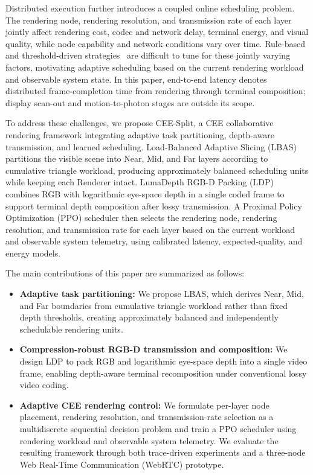 \documentclass[10pt,journal,compsoc]{IEEEtran}
\begin{document}
Distributed execution further introduces a coupled online scheduling problem. The rendering node, rendering resolution, and transmission rate of each layer jointly affect rendering cost, codec and network delay, terminal energy, and visual quality, while node capability and network conditions vary over time. Rule-based and threshold-driven strategies~\cite{lai_furion_2020,lu_renderfusion_2023} are difficult to tune for these jointly varying factors, motivating adaptive scheduling based on the current rendering workload and observable system state. In this paper, end-to-end latency denotes distributed frame-completion time from rendering through terminal composition; display scan-out and motion-to-photon stages are outside its scope.

To address these challenges, we propose CEE-Split, a CEE collaborative rendering framework integrating adaptive task partitioning, depth-aware transmission, and learned scheduling. Load-Balanced Adaptive Slicing (LBAS) partitions the visible scene into Near, Mid, and Far layers according to cumulative triangle workload, producing approximately balanced scheduling units while keeping each Renderer intact. LumaDepth RGB-D Packing (LDP) combines RGB with logarithmic eye-space depth in a single coded frame to support terminal depth composition after lossy transmission. A Proximal Policy Optimization (PPO) scheduler then selects the rendering node, rendering resolution, and transmission rate for each layer based on the current workload and observable system telemetry, using calibrated latency, expected-quality, and energy models.

The main contributions of this paper are summarized as follows:
\begin{itemize}
	\item \textbf{Adaptive task partitioning:}
	We propose LBAS, which derives Near, Mid, and Far boundaries from cumulative triangle workload rather than fixed depth thresholds, creating approximately balanced and independently schedulable rendering units.
	
	\item \textbf{Compression-robust RGB-D transmission and composition:}
	We design LDP to pack RGB and logarithmic eye-space depth into a single video frame, enabling depth-aware terminal recomposition under conventional lossy video coding.
	
	\item \textbf{Adaptive CEE rendering control:}
	We formulate per-layer node placement, rendering resolution, and transmission-rate selection as a multidiscrete sequential decision problem and train a PPO scheduler using rendering workload and observable system telemetry. We evaluate the resulting framework through both trace-driven experiments and a three-node Web Real-Time Communication (WebRTC) prototype.
\end{itemize}
\end{document}

